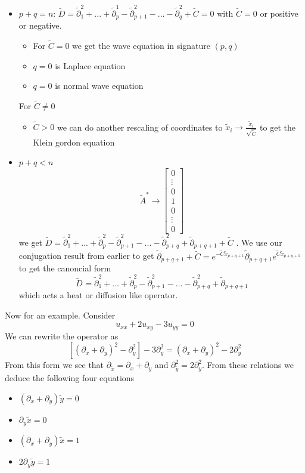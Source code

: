 \documentclass[11pt,a4paper]{article}
\begin{document}
\begin{itemize}
\item $p+q = n$: $\tilde{D} = \tilde{\partial}_{1}^{2}+...+\tilde{\partial}_{p}^{1}-\tilde{\partial}_{p+1}^{2}-...-\tilde{\partial}_{q}^{2}+\tilde{C} =  0$ with $\tilde{C} = 0$ or positive or negative.
\begin{itemize}
\item For $\tilde{C} = 0$ we get the wave equation in signature $(p,q)$
\item $q = 0$ is Laplace equation
\item $q = 0$ is normal wave equation
\end{itemize} 
For $\tilde{C}\neq 0$
\begin{itemize}
\item $\tilde{C}>0$ we can do another rescaling of coordinates to $\tilde{x}_{i}\to\frac{\tilde{x}_{i}}{\sqrt{\tilde{C}}}$ to get the Klein gordon equation
\end{itemize}
\item $p+q < n$ 
$$
\tilde{A}^{*} \to \begin{bmatrix}
	0 \\
	\vdots \\
	0\\
	1\\
	0\\
	\vdots\\
	0
\end{bmatrix}
$$ we get $\tilde{D} =  \tilde{\partial}_{1}^{2}+...+\tilde{\partial}_{p}^{2}-\tilde{\partial}_{p+1}^{2}-...-\tilde{\partial}_{p+q}^{2} + \tilde{\partial}_{p+q+1} + \tilde{C}$ . We use our conjugation result from earlier to get $\tilde{\partial}_{p+q+1} + \tilde{C} = e^{-\tilde{C}\tilde{x}_{p+q+1}}\tilde{\partial}_{p+q+1}e^{\tilde{C}\tilde{x}_{p+q+1}} $ to get the canoncial form
$$
\tilde{D}^{} =  \tilde{\partial}_{1}^{2}+...+\tilde{\partial}_{p}^{2}-\tilde{\partial}_{p+1}^{2}-...-\tilde{\partial}_{p+q}^{2} + \tilde{\partial}_{p+q+1}$$ which acts a heat or diffusion like operator.
\end{itemize}
Now for an example. Consider
$$
u_{xx} +2u_{xy}-3u_{yy} = 0
$$
We can rewrite the operator  as
$$
[(\partial_{x}+\partial_{y})^{2}-\partial_{y}^{2}] - 3\partial_{y}^{2} = (\partial_{x}+\partial_{y})^{2}-2\partial_{y}^{2}
$$
From this form we see that $\partial_{\tilde{x}} = \partial_{x}+\partial_{y}$ and $\partial_{\tilde{y}}^{2}=2\partial_{y}^{2}$. From these relations we deduce the following four equations
\begin{itemize}
\item $(\partial_{x}+\partial_{y})\tilde{y} = 0$
\item $\partial_{y}\tilde{x} = 0 $
\item $(\partial_{x}+\partial_{y})\tilde{x} = 1$
\item $2\partial_{y}\tilde{y} = 1 $
\end{itemize}
\end{document}
